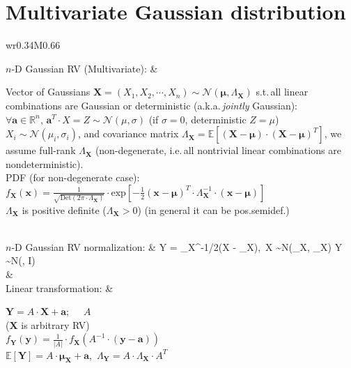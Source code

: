 \documentclass[10pt]{homework}
\newenvironment{mytable}
    { %
        \bgroup
        \centering
        \def\arraystretch{2.3}%
        \begin{longtable}{wr{0.34\textwidth}M{0.66\textwidth}}
    }
    { %
        \end{longtable}
        \egroup
    }
\newenvironment{mytextcol}
    { %
        \begin{minipage}[t]{0.6\textwidth}
    }
    { %
        \end{minipage}
    }
\begin{document}
\newpage
\section*{Multivariate Gaussian distribution}
\begin{mytable}
$n$-D Gaussian RV (Multivariate): & 
\begin{mytextcol}
Vector of Gaussians $\bm X = (X_1, X_2, \cdots, X_n)\sim \mathcal N(\bm \mu, \Lambda_{\bm X})$ s.t.\,all linear combinations are Gaussian or deterministic (a.k.a.\,\emph{jointly} Gaussian):
\\
\phantom{M}\quad $\forall \bm a \in \mathbb{R}^n,\, \bm a^T\cdot X = Z \sim  \mathcal N(\mu,\sigma)$ (if $\sigma = 0$, deterministic $Z=\mu$)
\\
$X_i \sim \mathcal N(\mu_i,\sigma_i)$, 
and covariance matrix $\Lambda_{\bm X} = \mathbb E[(\bm X - \bm \mu)\cdot (\bm X - \bm \mu)^T]$, we assume full-rank $\Lambda_{\bm X}$ (non-degenerate, i.e.\,all nontrivial linear combinations are nondeterministic). \\
PDF (for non-degenerate case): \\\phantom{M}\quad $\displaystyle 
f_{\bm X}(\bm x) = 
\frac{1}{\sqrt{\text{Det}(2\pi\cdot \Lambda_{\bm X})}}\cdot 
\text{exp}\left[
    -\frac{1}{2}
    (\bm x - \bm \mu)^T \cdot
    \Lambda_{\bm X}^{-1} \cdot
    (\bm x - \bm \mu)
\right]
$
\\
$\Lambda_{\bm X}$ is positive definite ($\Lambda_{\bm X}>0$) (in general it can be pos.\@ semidef.)
\end{mytextcol}
\\
$n$-D Gaussian RV normalization: &
\bm Y = \Lambda_{\bm X}^{-1/2}\cdot (\bm X - \bm \mu_{\bm X}),\,
\bm X \sim \mathcal N(\bm \mu_{\bm X}, \Lambda_{\bm X})
\implies \bm Y \sim \mathcal N(, I)
\\[-5pt]
& 
\\
Linear transformation: & 
\begin{mytextcol}
$\bm Y = A\cdot \bm X + \bm a
;\quad$
$A$ 
\\[4pt]
($\bm X$ is arbitrary RV)
\\[4pt]
$\displaystyle
f_{\bm Y}(\bm y) =
\frac{1}{|A|}\cdot
f_{\bm X}
\left(
    A^{-1}\cdot (\bm y-\bm a)
\right)
$
\\[4pt]
$\mathbb{E}[\bm Y] = A\cdot \bm \mu_{\bm X} + \bm a,$\quad
$\Lambda_{\bm Y} = A \cdot \Lambda_{\bm X} \cdot A^T$

\end{mytextcol}
\end{mytable}
\end{document}
